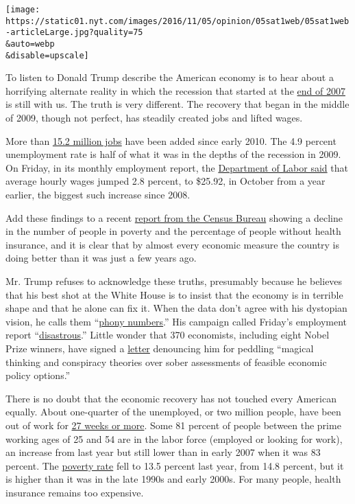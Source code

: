 \texttt{[image: https://static01.nyt.com/images/2016/11/05/opinion/05sat1web/05sat1web-articleLarge.jpg?quality=75\\\&auto=webp\\\&disable=upscale]}

To listen to Donald Trump describe the American economy is to hear about
a horrifying alternate reality in which the recession that started at
the \href{http://www.nber.org/cycles.html}{end of 2007} is still with
us. The truth is very different. The recovery that began in the middle
of 2009, though not perfect, has steadily created jobs and lifted wages.

More than
\href{http://beta.bls.gov/dataViewer/view/timeseries/CES0000000001}{15.2
million jobs} have been added since early 2010. The 4.9 percent
unemployment rate is half of what it was in the depths of the recession
in 2009. On Friday, in its monthly employment report, the
\href{http://www.nytimes.com/2016/11/05/business/economy/jobs-report.html?_r=0}{Department
of Labor said} that average hourly wages jumped 2.8 percent, to \$25.92,
in October from a year earlier, the biggest such increase since 2008.

Add these findings to a recent
\href{http://www.census.gov/newsroom/press-releases/2016/cb16-158.html}{report
from the Census Bureau} showing a decline in the number of people in
poverty and the percentage of people without health insurance, and it is
clear that by almost every economic measure the country is doing better
than it was just a few years ago.

Mr. Trump refuses to acknowledge these truths, presumably because he
believes that his best shot at the White House is to insist that the
economy is in terrible shape and that he alone can fix it. When the data
don't agree with his dystopian vision, he calls them
``\href{http://www.nytimes.com/2016/11/04/business/economy/unemployment-labor-department-data-politics.html}{phony
numbers}.'' His campaign called Friday's employment report
``\href{https://www.donaldjtrump.com/press-releases/statement-on-the-disastrous-jobs-report-underscores-the-total-failures-of-t}{disastrous}.''
Little wonder that 370 economists, including eight Nobel Prize winners,
have signed a
\href{http://blogs.wsj.com/economics/2016/11/01/prominent-economists-including-eight-nobel-laureates-do-not-vote-for-donald-trump/}{letter}
denouncing him for peddling ``magical thinking and conspiracy theories
over sober assessments of feasible economic policy options.''

There is no doubt that the economic recovery has not touched every
American equally. About one-quarter of the unemployed, or two million
people, have been out of work for
\href{http://www.bls.gov/news.release/pdf/empsit.pdf}{27 weeks or more}.
Some 81 percent of people between the prime working ages of 25 and 54
are in the labor force (employed or looking for work), an increase from
last year but still lower than in early 2007 when it was 83 percent. The
\href{http://www.census.gov/data/tables/time-series/demo/income-poverty/historical-poverty-people.html}{poverty
rate} fell to 13.5 percent last year, from 14.8 percent, but it is
higher than it was in the late 1990s and early 2000s. For many people,
health insurance remains too expensive.

